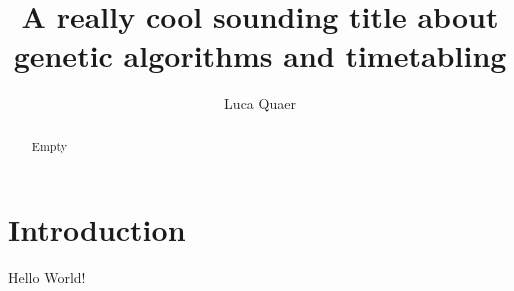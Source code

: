 \documentclass[sigconf]{acmart}
\begin{document}
\title{A really cool sounding title about genetic algorithms and timetabling}

\author{Luca Quaer}





\begin{abstract}
Empty
\end{abstract}




\maketitle


\section{Introduction}
Hello World! \cite{Abril07}









\end{document}
